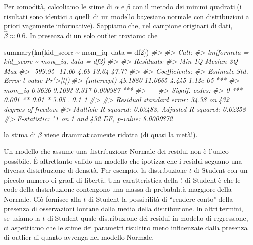 \documentclass[
]{memoir}
\newenvironment{Shaded}{\begin{snugshade}}{\end{snugshade}}
\newcommand{\AttributeTok}[1]{\textcolor[rgb]{0.77,0.63,0.00}{#1}}
\newcommand{\CommentTok}[1]{\textcolor[rgb]{0.56,0.35,0.01}{\textit{#1}}}
\newcommand{\FunctionTok}[1]{\textcolor[rgb]{0.00,0.00,0.00}{#1}}
\newcommand{\NormalTok}[1]{#1}
\newcommand{\SpecialCharTok}[1]{\textcolor[rgb]{0.00,0.00,0.00}{#1}}
\begin{document}
Per comodità, calcoliamo le stime di \(\alpha\) e \(\beta\) con il metodo dei minimi quadrati (i risultati sono identici a quelli di un modello bayesiano normale con distribuzioni a priori vagamente informative). Sappiamo che, nel campione originari di dati, \(\hat{\beta} \approx 0.6\). In presenza di un solo outlier troviamo che

\begin{Shaded}
\begin{Highlighting}[]
\FunctionTok{summary}\NormalTok{(}\FunctionTok{lm}\NormalTok{(kid\_score }\SpecialCharTok{\textasciitilde{}}\NormalTok{ mom\_iq, }\AttributeTok{data =}\NormalTok{ df2))}
\CommentTok{\#\textgreater{} }
\CommentTok{\#\textgreater{} Call:}
\CommentTok{\#\textgreater{} lm(formula = kid\_score \textasciitilde{} mom\_iq, data = df2)}
\CommentTok{\#\textgreater{} }
\CommentTok{\#\textgreater{} Residuals:}
\CommentTok{\#\textgreater{}     Min      1Q  Median      3Q     Max }
\CommentTok{\#\textgreater{} {-}599.95  {-}11.00    4.69   13.64   47.77 }
\CommentTok{\#\textgreater{} }
\CommentTok{\#\textgreater{} Coefficients:}
\CommentTok{\#\textgreater{}             Estimate Std. Error t value Pr(\textgreater{}|t|)    }
\CommentTok{\#\textgreater{} (Intercept)  49.1880    11.0665   4.445 1.12e{-}05 ***}
\CommentTok{\#\textgreater{} mom\_iq        0.3626     0.1093   3.317 0.000987 ***}
\CommentTok{\#\textgreater{} {-}{-}{-}}
\CommentTok{\#\textgreater{} Signif. codes:  }
\CommentTok{\#\textgreater{} 0 \textquotesingle{}***\textquotesingle{} 0.001 \textquotesingle{}**\textquotesingle{} 0.01 \textquotesingle{}*\textquotesingle{} 0.05 \textquotesingle{}.\textquotesingle{} 0.1 \textquotesingle{} \textquotesingle{} 1}
\CommentTok{\#\textgreater{} }
\CommentTok{\#\textgreater{} Residual standard error: 34.38 on 432 degrees of freedom}
\CommentTok{\#\textgreater{} Multiple R{-}squared:  0.02483,    Adjusted R{-}squared:  0.02258 }
\CommentTok{\#\textgreater{} F{-}statistic:    11 on 1 and 432 DF,  p{-}value: 0.0009872}
\end{Highlighting}
\end{Shaded}

\noindent
la stima di \(\beta\) viene drammaticamente ridotta (di quasi la metà!).

Un modello che assume una distribuzione Normale dei residui non è l'unico possibile. È altrettanto valido un modello che ipotizza che i residui seguano una diversa distribuzione di densità. Per esempio, la distribuzione \(t\) di Student con un piccolo numero di gradi di libertà. Una caratteristica della \(t\) di Student è che le code della distribuzione contengono una massa di probabilità maggiore della Normale. Ciò fornisce alla \(t\) di Student la possibilità di ``rendere conto'' della presenza di osservazioni lontane dalla media della distribuzione. In altri termini, se usiamo la \(t\) di Student quale distribuzione dei residui in modello di regressione, ci aspettiamo che le stime dei parametri risultino meno influenzate dalla presenza di outlier di quanto avvenga nel modello Normale.
\end{document}
